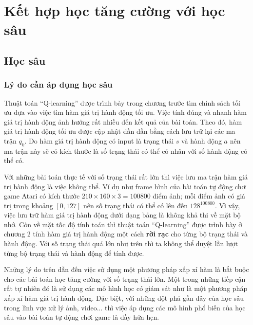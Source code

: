 \section{Kết hợp học tăng cường với học sâu}

\subsection{Học sâu}
\subsubsection*{Lý do cần áp dụng học sâu}
	Thuật toán ``Q-learning'' được trình bày trong chương trước tìm chính sách tối ưu dựa vào việc tìm hàm giá trị hành động tối ưu. 
	Việc tính đúng và nhanh hàm giá trị hành động ảnh hưởng rất nhiều đến kết quả của bài toán. 
	Theo đó, hàm giá trị hành động tối ưu được cập nhật dần dần bằng cách lưu trữ lại các ma trận $q_{k}$.
	Do hàm giá trị hành động có input là trạng thái $s$ và hành động $a$ nên ma trận này sẽ có kích thước là số trạng thái có thể có nhân với số hành động có thể có.
	
	Với những bài toán thực tế với số trạng thái rất lớn thì việc lưu ma trận hàm giá trị hành động là việc không thể. 
	Ví dụ như frame hình của bài toán tự động chơi game Atari có kích thước $210\times160\times3=100800$ điểm ảnh; mỗi điểm ảnh có giá trị trong khoảng $[0, 127]$ nên số trạng thái có thể có lên đến $128^{100800}$.
	Vì vậy, việc lưu trữ hàm giá trị hành động dưới dạng bảng là không khả thi về mặt bộ nhớ.
	Còn về mặt tốc độ tính toán thì thuật toán ``Q-learning'' được trình bày ở chương 2 tính hàm giá trị hành động một cách \textbf{rời rạc} cho từng bộ trạng thái và hành động.
	Với số trạng thái quá lớn như trên thì ta không thể duyệt lần lượt từng bộ trạng thái và hành động để tính được.
	
	Những lý do trên dẫn đến việc sử dụng một phương pháp xấp xỉ hàm là bắt buộc cho các bài toán học tăng cường với số trạng thái lớn.
	Một trong những tiếp cận rất tự nhiên đó là sử dụng các mô hình học có giám sát như là một phương pháp xấp xỉ hàm giá trị hành động.
	Đặc biệt, với những đột phá gần đây của học sâu trong lĩnh vực xử lý ảnh, video... \cite{lecun2015deep} thì việc áp dụng các mô hình phổ biến của học sâu vào bài toán tự động chơi game là đầy hứa hẹn.
	
